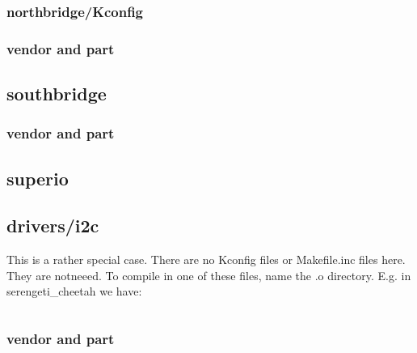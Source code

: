 \documentclass[10pt,letterpaper]{article}
\begin{document}
\subsubsection{northbridge/Kconfig}




\subsubsection{vendor and part}
\subsection{southbridge}
\subsubsection{vendor and part}
\subsection{superio}
\subsection{drivers/i2c}
This is a rather special case. There are no Kconfig files or Makefile.inc files here. They are notneeed. 
To compile in one of these files, name the .o directory. E.g. in serengeti\_cheetah we have: 
\begin{verbatim}
\end{verbatim}

\subsubsection{vendor and part}
\end{document}
